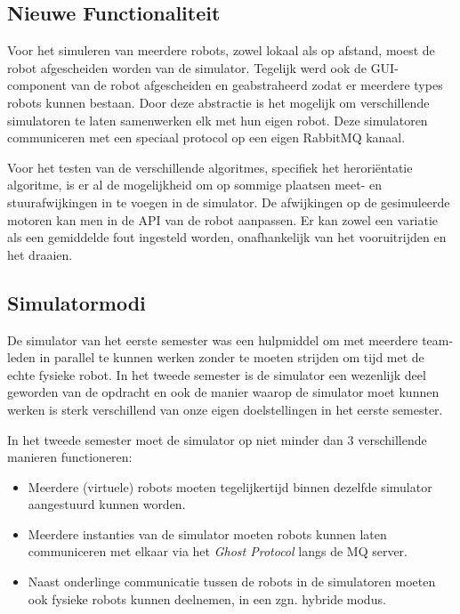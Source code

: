 \documentclass[12pt,a4paper]{report}
\begin{document}
\subsection{Nieuwe Functionaliteit}

Voor het simuleren van meerdere robots, zowel lokaal als op afstand, moest de robot afgescheiden worden van de simulator. Tegelijk werd ook de GUI-component van de robot afgescheiden en geabstraheerd zodat er meerdere types robots kunnen bestaan. Door deze abstractie is het mogelijk om verschillende simulatoren te laten samenwerken elk met hun eigen robot. Deze simulatoren communiceren met een speciaal protocol op een eigen RabbitMQ kanaal.

Voor het testen van de verschillende algoritmes, specifiek het herori\"entatie algoritme, is er al de mogelijkheid om op sommige plaatsen meet- en stuurafwijkingen in te voegen in de simulator. De afwijkingen op de gesimuleerde motoren kan men in de API van de robot aanpassen. Er kan zowel een variatie als een gemiddelde fout ingesteld worden, onafhankelijk van het vooruitrijden en het draaien.

\subsection{Simulatormodi}

De simulator van het eerste semester was een hulpmiddel om met meerdere team-leden in parallel te kunnen werken zonder te moeten strijden om tijd met de echte fysieke robot. In het tweede semester is de simulator een wezenlijk deel geworden van de opdracht en ook de manier waarop de simulator moet kunnen werken is sterk verschillend van onze eigen doelstellingen in het eerste semester.

In het tweede semester moet de simulator op niet minder dan 3 verschillende manieren functioneren:

\begin{itemize}
\item Meerdere (virtuele) robots moeten tegelijkertijd binnen dezelfde simulator aangestuurd kunnen worden.
\item Meerdere instanties van de simulator moeten robots kunnen laten communiceren met elkaar via het \emph{Ghost Protocol} langs de MQ server.
\item Naast onderlinge communicatie tussen de robots in de simulatoren moeten ook fysieke robots kunnen deelnemen, in een zgn. hybride modus.
\end{itemize}
\end{document}
